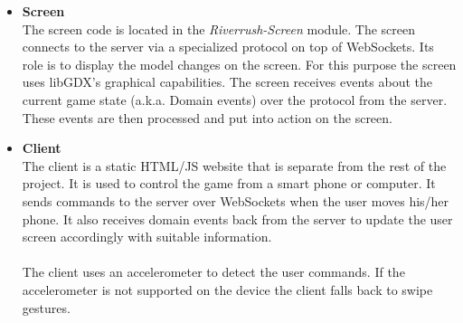 \documentclass[11pt,a4paper]{article}
\begin{document}
\begin{itemize}
\item \textbf{Screen} \\
The screen code is located in the \emph{Riverrush-Screen} module. The screen connects to the server via a specialized protocol on top of WebSockets. Its role is to display the model changes on the screen. For this purpose the screen uses libGDX's graphical capabilities. The screen receives events about the current game state (a.k.a. Domain events) over the protocol from the server. These events are then processed and put into action on the screen.\\

\item \textbf{Client} \\
The client is a static HTML/JS website that is separate from the rest of the project. It is used to control the game from a smart phone or computer. It sends commands to the server over WebSockets when the user moves his/her phone. It also receives domain events back from the server to update the user screen accordingly with suitable information.\\
\\
The client uses an accelerometer to detect the user commands. If the accelerometer is not supported on the device the client falls back to swipe gestures.


\end{itemize}
\end{document}

